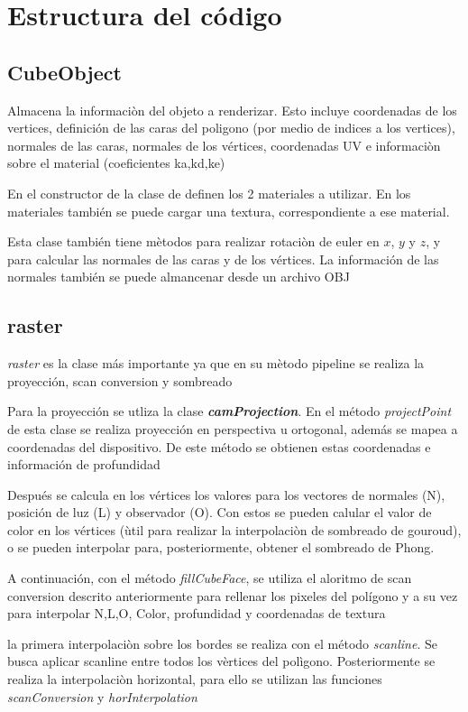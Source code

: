 \documentclass[12pt]{article}
\begin{document}
\section{Estructura del código}


 \subsection{CubeObject}
Almacena la informaciòn del objeto a renderizar. Esto incluye coordenadas de los vertices, definición de las caras del poligono (por medio de indices a los vertices), normales de las caras, normales de los vértices, coordenadas UV e informaciòn sobre el material (coeficientes ka,kd,ke)

En el constructor de la clase de definen los 2 materiales a utilizar. En los materiales también se puede cargar una textura, correspondiente a ese material.

Esta clase también tiene mètodos para realizar rotaciòn de euler en $x$, $y$ y $z$, y para calcular las normales de las caras y de los vértices. La información de las normales también se puede almancenar desde un archivo OBJ

\subsection{raster}
\textit{raster} es la clase más importante ya que en su mètodo pipeline se realiza la proyección, scan conversion y sombreado

Para la proyección se utliza la clase \textit{\textbf{camProjection}}. En el método \textit{projectPoint} de esta clase se realiza proyección en perspectiva u ortogonal, además se mapea a coordenadas del dispositivo. De este método se obtienen estas coordenadas e información de profundidad

Después se calcula en los vértices los valores para los vectores de normales (N), posición de luz (L) y observador (O). Con estos se pueden calular el valor de color en los vértices (ùtil para realizar la interpolaciòn de sombreado de gouroud), o se pueden interpolar para, posteriormente, obtener el sombreado de Phong.

A continuación, con el método \textit{fillCubeFace}, se utiliza el aloritmo de scan conversion descrito anteriormente para rellenar los pixeles del polígono y a su vez para interpolar N,L,O, Color, profundidad y coordenadas de textura 

la primera interpolaciòn sobre los bordes se realiza con el método \textit{scanline}. Se busca aplicar scanline entre todos los vèrtices del polìgono. Posteriormente se realiza la interpolaciòn horizontal, para ello se utilizan las funciones \textit{scanConversion} y \textit{horInterpolation}
\end{document}
